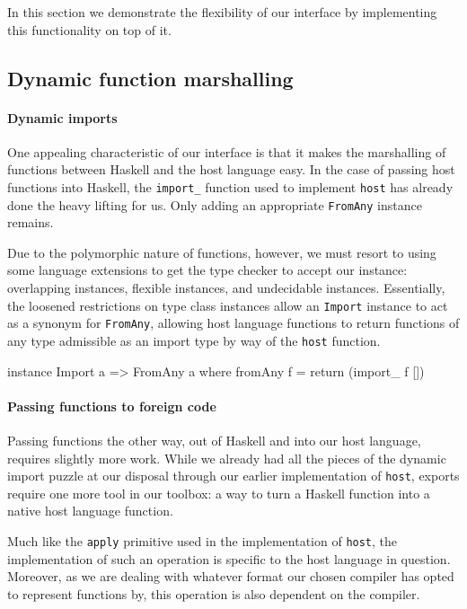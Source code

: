 \documentclass[preprint]{sigplanconf}
\begin{document}
In this section we demonstrate the flexibility of our interface by implementing
this functionality on top of it.

\subsection{Dynamic function marshalling}
\label{sec:marshalling-functions}
\paragraph{Dynamic imports}
One appealing characteristic of our interface is that it makes the marshalling
of functions between Haskell and the host language easy. In the case of
passing host functions into Haskell, the \lstinline!import_! function used to
implement \lstinline!host! has already done the heavy lifting for us.
Only adding an appropriate \lstinline!FromAny! instance remains.

Due to the polymorphic nature of functions, however, we must resort to using
some language extensions to get the type checker to accept our instance:
overlapping instances, flexible instances, and undecidable instances.
Essentially, the loosened restrictions on type class instances allow an
\lstinline!Import! instance to act as a synonym for \lstinline!FromAny!,
allowing host language functions to return functions of any type admissible
as an import type by way of the \lstinline!host! function.

\begin{code}
  instance Import a => FromAny a where
    fromAny f = return (import_ f [])
\end{code}

\paragraph{Passing functions to foreign code}
Passing functions the other way, out of Haskell and into our host language,
requires slightly more work. While we already had all the pieces of the
dynamic import puzzle at our disposal through our earlier implementation of
\lstinline!host!, exports require one more tool in our toolbox: a way to turn
a Haskell function into a native host language function.

Much like the \lstinline!apply! primitive used in the implementation of
\lstinline!host!, the implementation of such an operation is specific to the
host language in question. Moreover, as we are dealing with whatever format
our chosen compiler has opted to represent functions by, this operation is also
dependent on the compiler.
\end{document}
